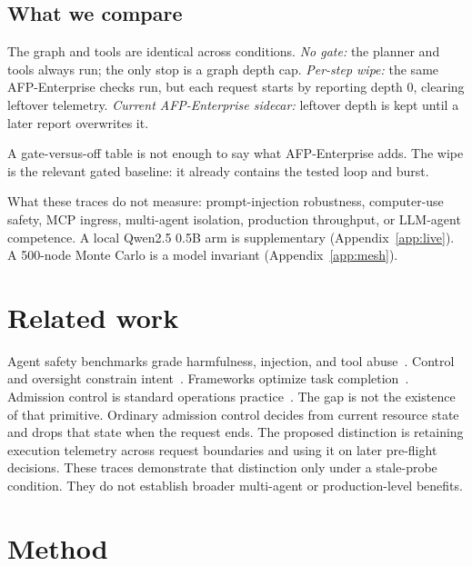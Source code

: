 \documentclass[11pt,a4paper]{article}
\begin{document}
\subsection{What we compare}
\label{sec:conditions}

The graph and tools are identical across conditions.
\emph{No gate:} the planner and tools always run; the only stop is a graph depth cap.
\emph{Per-step wipe:} the same AFP-Enterprise checks run, but each request starts by reporting depth $0$, clearing leftover telemetry.
\emph{Current AFP-Enterprise sidecar:} leftover depth is kept until a later report overwrites it.

A gate-versus-off table is not enough to say what AFP-Enterprise adds.
The wipe is the relevant gated baseline: it already contains the tested loop and burst.

What these traces do not measure: prompt-injection robustness, computer-use safety, MCP ingress, multi-agent isolation, production throughput, or LLM-agent competence.
A local Qwen2.5 0.5B arm is supplementary (Appendix~\ref{app:live}).
A 500-node Monte Carlo is a model invariant (Appendix~\ref{app:mesh}).

\section{Related work}
\label{sec:related}

Agent safety benchmarks grade harmfulness, injection, and tool abuse~\citep{debenedetti2024agentdojo,andriushchenko2024agentharm,ruan2024identifying,greshake2023not}.
Control and oversight constrain intent~\citep{greenblatt2024control,zou2024circuit,kenton2024oversight}.
Frameworks optimize task completion~\citep{yao2023react,wu2023autogen,langchain2025langgraph}.
Admission control is standard operations practice~\citep{nygard2018release,fowler2014circuit,envoy2024circuit}.
The gap is not the existence of that primitive.
Ordinary admission control decides from current resource state and drops that state when the request ends.
The proposed distinction is retaining execution telemetry across request boundaries and using it on later pre-flight decisions.
These traces demonstrate that distinction only under a stale-probe condition.
They do not establish broader multi-agent or production-level benefits.

\section{Method}
\label{sec:method}
\end{document}
